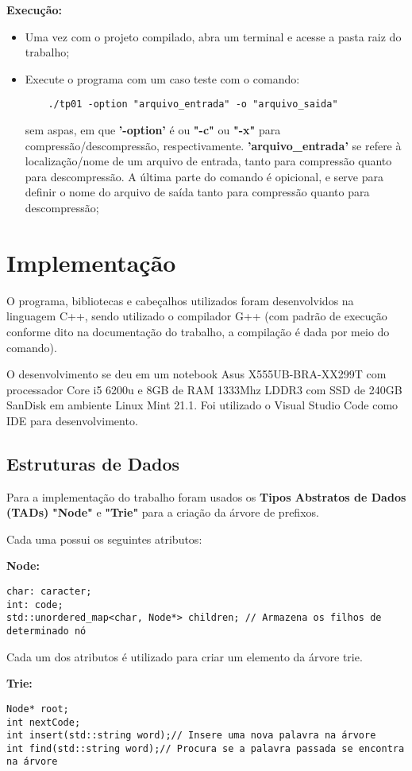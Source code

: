 \documentclass[12pt]{article}
\begin{document}
\par \textbf{Execução:}
\begin{itemize}
	\item Uma vez com o projeto compilado, abra um terminal e acesse a pasta raiz do trabalho;
	\item Execute o programa com um caso teste com o comando:
	      \begin{verbatim}
	./tp01 -option "arquivo_entrada" -o "arquivo_saida"
	\end{verbatim}

	      sem aspas, em que \textbf{'-option'} é ou \textbf{"-c"} ou \textbf{"-x"} para compressão/descompressão, respectivamente. \textbf{'arquivo\_entrada'} se refere à localização/nome de um arquivo de entrada, tanto para compressão quanto para descompressão. A última parte do comando é opicional, e serve para definir o nome do arquivo de saída tanto para compressão quanto para descompressão;
\end{itemize}


\section{Implementação}

\par O programa, bibliotecas e cabeçalhos utilizados foram desenvolvidos na linguagem C++,
sendo utilizado o compilador G++ (com padrão de execução conforme dito na documentação do trabalho, a compilação
é dada por meio do comando).
\par O desenvolvimento se deu em um notebook Asus X555UB-BRA-XX299T com processador Core i5 6200u e 8GB de RAM 1333Mhz
LDDR3 com SSD de 240GB SanDisk em ambiente Linux Mint 21.1. Foi utilizado o Visual Studio Code como IDE para
desenvolvimento.

\subsection{Estruturas de Dados}
\par Para a implementação do trabalho foram usados os \textbf{Tipos Abstratos de Dados (TADs)} \textbf{"Node"} e \textbf{"Trie"} para a criação da árvore de prefixos.
\par Cada uma possui os seguintes atributos:
\par \textbf{Node:}
\begin{verbatim}
char: caracter;
int: code;
std::unordered_map<char, Node*> children; // Armazena os filhos de determinado nó
    \end{verbatim}
\par Cada um dos atributos é utilizado para criar um elemento da árvore trie.
\par \textbf{Trie:}
\begin{verbatim}
Node* root;
int nextCode;
int insert(std::string word);// Insere uma nova palavra na árvore
int find(std::string word);// Procura se a palavra passada se encontra na árvore
\end{verbatim}
\end{document}
